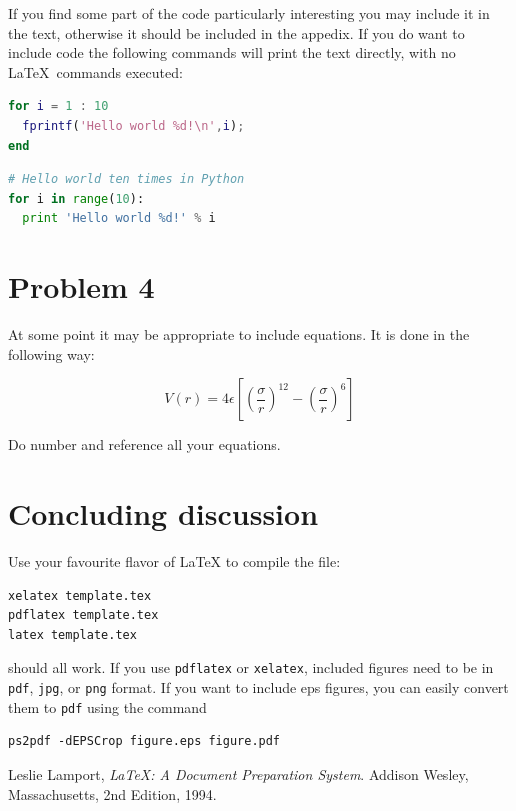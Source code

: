 If you find some part of the code particularly interesting you may 
include it in the text, otherwise it should be included in the appedix.
If you do want to include code the following commands will print
the text directly, with no \LaTeX~commands executed:

\begin{lstlisting}[language=matlab]
% Hello world ten times in MATLAB
for i = 1 : 10
  fprintf('Hello world %d!\n',i);
end
\end{lstlisting}

\begin{lstlisting}[language=python]
# Hello world ten times in Python
for i in range(10):
  print 'Hello world %d!' % i
\end{lstlisting}

\section*{Problem 4}
At some point it may be appropriate to include equations. It is done in the
following way:

\begin{equation}
  V(r) = 4\epsilon \left[ \left( \frac{\sigma}{r} \right)^{12} - 
    \left(\frac{\sigma}{r} \right)^{6} \right]
\end{equation}

Do number and reference all your equations.

\section*{Concluding discussion}

Use your favourite flavor of \LaTeX{} to compile the file:
\begin{verbatim}
xelatex template.tex
pdflatex template.tex
latex template.tex
\end{verbatim}
should all work.
If you use \verb+pdflatex+ or \verb+xelatex+, included figures need to be in
\verb+pdf+, \verb+jpg+, or \verb+png+ format. If you want to include eps
figures, you can easily convert them to \verb+pdf+ using the command
\begin{verbatim}
ps2pdf -dEPSCrop figure.eps figure.pdf
\end{verbatim}

\begin{thebibliography}{69}
 Leslie Lamport, \emph{\LaTeX: A Document Preparation
System}. Addison Wesley, Massachusetts, 2nd Edition, 1994.
\end{thebibliography}

